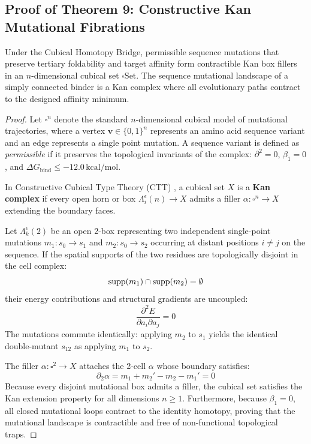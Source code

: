 \subsection{Proof of Theorem 9: Constructive Kan Mutational Fibrations}
\begin{theorem}
\label{thm:kan_fibrations}
Under the Cubical Homotopy Bridge, permissible sequence mutations that preserve tertiary foldability and target affinity form contractible Kan box fillers in an $n$-dimensional cubical set $\square\mathrm{Set}$. The sequence mutational landscape of a simply connected binder is a Kan complex where all evolutionary paths contract to the designed affinity minimum.
\end{theorem}

\begin{proof}
Let $\square^n$ denote the standard $n$-dimensional cubical model of mutational trajectories, where a vertex $\mathbf{v} \in \{0, 1\}^n$ represents an amino acid sequence variant and an edge represents a single point mutation. A sequence variant is defined as \textit{permissible} if it preserves the topological invariants of the complex: $\partial^2 = 0$, $\beta_1 = 0$, and $\Delta G_{\text{bind}} \le -12.0\,\text{kcal/mol}$.

In Constructive Cubical Type Theory (CTT) \cite{coquand2019cubical}, a cubical set $X$ is a \textbf{Kan complex} if every open horn or box $\Lambda_i^\epsilon(n) \to X$ admits a filler $\alpha : \square^n \to X$ extending the boundary faces. 

Let $\Lambda_k^\epsilon(2)$ be an open 2-box representing two independent single-point mutations $m_1 : s_0 \to s_1$ and $m_2 : s_0 \to s_2$ occurring at distant positions $i \ne j$ on the sequence. If the spatial supports of the two residues are topologically disjoint in the cell complex:
\begin{equation}
    \operatorname{supp}(m_1) \cap \operatorname{supp}(m_2) = \emptyset
\end{equation}
their energy contributions and structural gradients are uncoupled:
\begin{equation}
    \frac{\partial^2 E}{\partial a_i \partial a_j} = 0
\end{equation}
The mutations commute identically: applying $m_2$ to $s_1$ yields the identical double-mutant $s_{12}$ as applying $m_1$ to $s_2$. 

The filler $\alpha : \square^2 \to X$ attaches the 2-cell $\alpha$ whose boundary satisfies:
\begin{equation}
    \partial_2 \alpha = m_1 + m_{2}' - m_2 - m_{1}' = 0
\end{equation}
Because every disjoint mutational box admits a filler, the cubical set satisfies the Kan extension property for all dimensions $n \ge 1$. Furthermore, because $\beta_1 = 0$, all closed mutational loops contract to the identity homotopy, proving that the mutational landscape is contractible and free of non-functional topological traps.
\end{proof}

